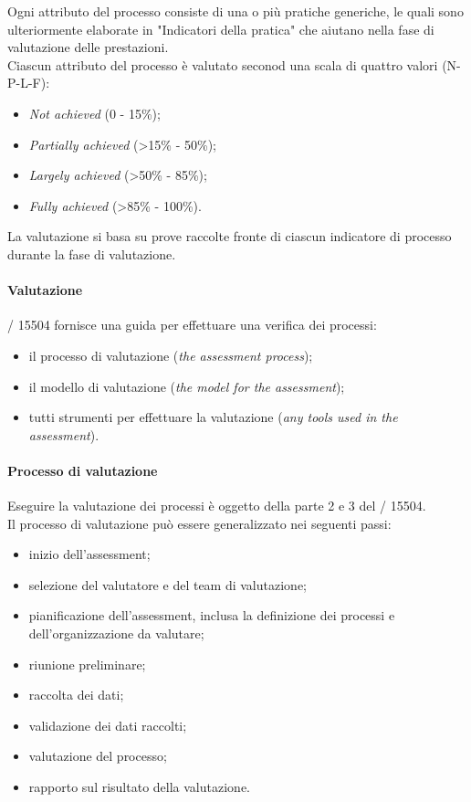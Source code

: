   Ogni attributo del processo consiste di una o più pratiche generiche, le quali sono ulteriormente elaborate in "Indicatori della pratica" che aiutano nella fase di valutazione delle prestazioni.
  \\Ciascun attributo del processo è valutato seconod una scala di quattro valori (N-P-L-F):
  \begin{itemize}
    \item \emph{Not achieved} (0 - 15\%);
    \item \emph{Partially achieved} (>15\% - 50\%);
    \item \emph{Largely achieved} (>50\% - 85\%);
    \item \emph{Fully achieved} (>85\% - 100\%).
  \end{itemize}
  La valutazione si basa su prove raccolte fronte di ciascun indicatore di processo durante la fase di valutazione.\\

  \paragraph{Valutazione}
  / 15504 fornisce una guida per effettuare una verifica dei processi:
  \begin{itemize}
    \item il processo di valutazione (\emph{the assessment process});
    \item il modello di valutazione (\emph{the model for the assessment});
    \item tutti strumenti per effettuare la valutazione (\emph{any tools used in the assessment}).
  \end{itemize}
  \paragraph{Processo di valutazione}
  Eseguire la valutazione dei processi è oggetto della parte 2 e 3 del / 15504.\\
  Il processo di valutazione può essere generalizzato nei seguenti passi:
  \begin{itemize}
    \item inizio dell'assessment;
    \item selezione del valutatore e del team di valutazione;
    \item pianificazione dell'assessment, inclusa la definizione dei processi e dell'organizzazione da valutare;
    \item riunione preliminare;
    \item raccolta dei dati;
    \item validazione dei dati raccolti;
    \item valutazione del processo;
    \item rapporto sul risultato della valutazione.
  \end{itemize}
  
